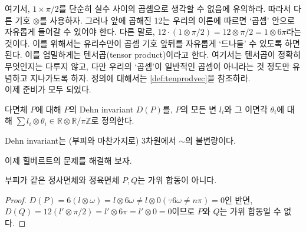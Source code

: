 여기서, $1\times \pi/2$를 단순히 실수 사이의 곱셈으로 생각할 수 없음에 유의하라. 따라서 다른 기호 $\otimes$를 사용하자. 그러나 앞에 곱해진 12는 우리의 이론에 따르면 `곱셈' 안으로 자유롭게 들어갈 수 있어야 한다. 다른 말로, $12\cdot(1\otimes \pi/2)=12\otimes \pi/2=1\otimes 6\pi$라는 것이다. 이를 위해서는 유리수만이 곱셈 기호 앞뒤를 자유롭게 `드나들' 수 있도록 하면 된다. 이를 엄밀하게는 텐서곱(tensor product)이라고 한다. 여기서는 텐서곱이 정확히 무엇인지는 다루지 않고, 다만 우리의 `곱셈'이 일반적인 곱셈이 아니라는 것 정도만 유념하고 지나가도록 하자. 정의에 대해서는 \cref{def:tenprodvec}을 참조하라. \\
이제 준비가 모두 되었다. 
\begin{definition}
    다면체 $P$에 대해 $P$의 Dehn invariant $D(P)$를, $P$의 모든 변 $l_i$와 그 이면각 $\theta_i$에 대해 $\sum l_i \otimes \theta_i \in \mathbb{R} \otimes \mathbb{R}/{\pi \mathbb{Z}}$로 정의한다. 
\end{definition}
\begin{remark}
    Dehn invariant는 (부피와 마찬가지로) 3차원에서 $\sim$의 불변량이다. 
\end{remark}
이제 힐베르트의 문제를 해결해 보자. 
\begin{theorem}
    부피가 같은 정사면체와 정육면체 $P, Q$는 가위 합동이 아니다.
\end{theorem}
\begin{proof}
    $D(P)=6(l\otimes \omega)=l\otimes 6\omega \neq l\otimes 0(\because 6\omega\neq n\pi)=0$인 반면, $D(Q)=12(l' \otimes \pi/2)=l' \otimes 6 \pi=l' \otimes 0=0$이므로 $P$와 $Q$는 가위 합동일 수 없다. 
\end{proof}
